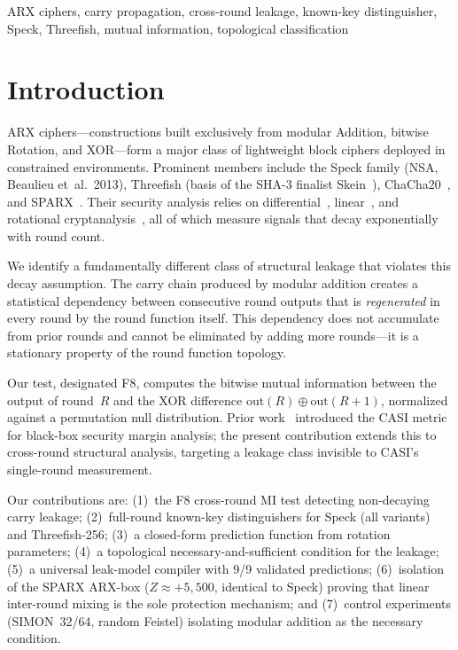 \documentclass[conference,a4paper]{IEEEtran}
\begin{document}
\begin{IEEEkeywords}
ARX ciphers, carry propagation, cross-round leakage, known-key distinguisher, Speck, Threefish, mutual information, topological classification
\end{IEEEkeywords}

\section{Introduction}

ARX ciphers---constructions built exclusively from modular Addition, bitwise Rotation, and XOR---form a major class of lightweight block ciphers deployed in constrained environments. Prominent members include the Speck family (NSA, Beaulieu et~al.~2013), Threefish (basis of the SHA-3 finalist Skein~\cite{ferguson2010}), ChaCha20~\cite{bernstein2008}, and SPARX~\cite{dinu2016}. Their security analysis relies on differential~\cite{biham1991}, linear~\cite{matsui1993}, and rotational cryptanalysis~\cite{khovratovich2010}, all of which measure signals that decay exponentially with round count.

We identify a fundamentally different class of structural leakage that violates this decay assumption. The carry chain produced by modular addition creates a statistical dependency between consecutive round outputs that is \emph{regenerated} in every round by the round function itself. This dependency does not accumulate from prior rounds and cannot be eliminated by adding more rounds---it is a stationary property of the round function topology.

Our test, designated F8, computes the bitwise mutual information between the output of round~$R$ and the XOR difference $\mathrm{out}(R) \oplus \mathrm{out}(R{+}1)$, normalized against a permutation null distribution. Prior work~\cite{foss2026crypto} introduced the CASI metric for black-box security margin analysis; the present contribution extends this to cross-round structural analysis, targeting a leakage class invisible to CASI's single-round measurement.

Our contributions are: (1)~the F8 cross-round MI test detecting non-decaying carry leakage; (2)~full-round known-key distinguishers for Speck (all variants) and Threefish-256; (3)~a closed-form prediction function from rotation parameters; (4)~a topological necessary-and-sufficient condition for the leakage; (5)~a universal leak-model compiler with 9/9 validated predictions; (6)~isolation of the SPARX ARX-box ($Z \approx +5{,}500$, identical to Speck) proving that linear inter-round mixing is the sole protection mechanism; and (7)~control experiments (SIMON~32/64, random Feistel) isolating modular addition as the necessary condition.
\end{document}
